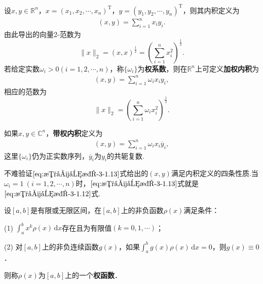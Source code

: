 \documentclass[../../main.tex]{subfiles}
\begin{document}
\begin{definition}
设\( x,y \in \mathbb{R}^n \)，\( x=(x_1,x_2,\cdots,x_n)^{\mathrm{T}} \)，\( y=(y_1,y_2,\cdots,y_n)^{\mathrm{T}} \)，则其内积定义为
\begin{align}
(x,y)=\sum_{i=1}^n x_i y_i. \label{eq:数值分析-3-1.12}
\end{align}
由此导出的向量2-范数为
\[
\|x\|_2=(x,x)^{\frac{1}{2}}=\left( \sum_{i=1}^n x_i^2 \right)^{\frac{1}{2}}.
\]
若给定实数\( \omega_i>0(i=1,2,\cdots,n) \)，称\( \{\omega_i\} \)为\textbf{权系数}，则在\( \mathbb{R}^n \)上可定义\textbf{加权内积}为
\begin{align}
(x,y)=\sum_{i=1}^n \omega_i x_i y_i, \label{eq:数值分析-3-1.13}
\end{align}
相应的范数为
\[
\|x\|_2=\left( \sum_{i=1}^n \omega_i x_i^2 \right)^{\frac{1}{2}}.
\]

如果\( x,y \in \mathbb{C}^n \)，\textbf{带权内积}定义为
\begin{align}
(x,y)=\sum_{i=1}^n \omega_i x_i \overline{y}_i, \label{eq:数值分析-3-1.14}
\end{align}
这里\( \{\omega_i\} \)仍为正实数序列，\( \overline{y}_i \)为\( y_i \)的共轭复数.
\end{definition}
\begin{remark}
不难验证\(\eqref{eq:数值分析-3-1.13}\)式给出的\( (x,y) \)满足内积定义的四条性质.当\( \omega_i=1 \ (i=1,2,\cdots,n) \)时，\(\eqref{eq:数值分析-3-1.13}\)式就是\(\eqref{eq:数值分析-3-1.12}\)式.
\end{remark}

\begin{definition}[权函数]
设\([a,b]\)是有限或无限区间，在\([a,b]\)上的非负函数\(\rho(x)\)满足条件：

(1) \(\int_a^b x^k \rho(x) \, \mathrm{d}x\)存在且为有限值\((k=0,1,\cdots)\)；

(2) 对\([a,b]\)上的非负连续函数\(g(x)\)，如果\(\int_a^b g(x) \rho(x) \, \mathrm{d}x = 0\)，则\(g(x) \equiv 0\)．

则称\(\rho(x)\)为\([a,b]\)上的一个\textbf{权函数}．
\end{definition}
\end{document}
